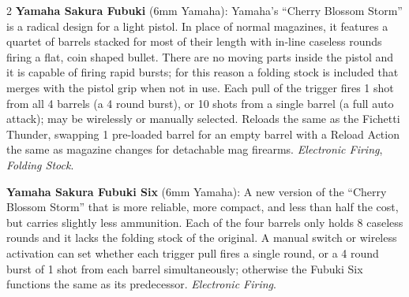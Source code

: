 \documentclass[
  oneside]{article}
\begin{document}
\begin{multicols}{2}
\textbf{Yamaha Sakura Fubuki} (6mm Yamaha):
Yamaha's ``Cherry Blossom Storm'' is a radical
design for a light pistol. In place of normal
magazines, it features a quartet of barrels
stacked for most of their length with in-line
caseless rounds firing a flat, coin shaped bullet.
There are no moving parts inside the pistol and it
is capable of firing rapid bursts; for this reason
a folding stock is included that merges with the
pistol grip when not in use. Each pull of the
trigger fires 1 shot from all 4 barrels (a 4 round
burst), or 10 shots from a single barrel (a full
auto attack); may be wirelessly or manually
selected. Reloads the same as the Fichetti
Thunder, swapping 1 pre-loaded barrel for an empty
barrel with a Reload Action the same as magazine
changes for detachable mag firearms.
\emph{Electronic Firing}, \emph{Folding Stock}.

\textbf{Yamaha Sakura Fubuki Six} (6mm Yamaha): A
new version of the ``Cherry Blossom Storm'' that
is more reliable, more compact, and less than half
the cost, but carries slightly less ammunition.
Each of the four barrels only holds 8 caseless
rounds and it lacks the folding stock of the
original. A manual switch or wireless activation
can set whether each trigger pull fires a single
round, or a 4 round burst of 1 shot from each
barrel simultaneously; otherwise the Fubuki Six
functions the same as its predecessor.
\emph{Electronic Firing}.

\end{multicols}
\end{document}
